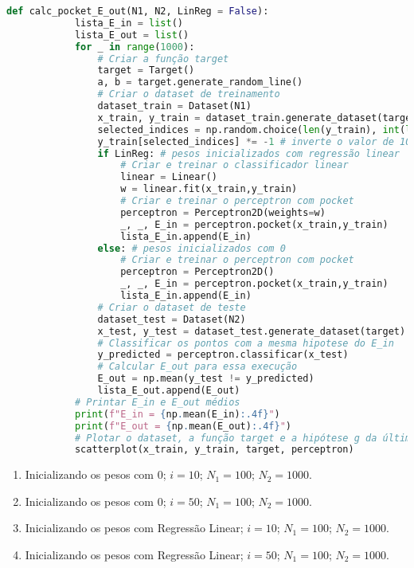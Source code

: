 \begin{enumerate}
    \begin{lstlisting}[language=Python, caption=Cálculo do E\_out, label=cod:calc_pocket_E_out]
        def calc_pocket_E_out(N1, N2, LinReg = False):
            lista_E_in = list()
            lista_E_out = list()
            for _ in range(1000):
                # Criar a função target
                target = Target()
                a, b = target.generate_random_line()
                # Criar o dataset de treinamento
                dataset_train = Dataset(N1)
                x_train, y_train = dataset_train.generate_dataset(target)
                selected_indices = np.random.choice(len(y_train), int(len(y_train) * 0.1), replace=False) # seleciona 10%
                y_train[selected_indices] *= -1 # inverte o valor de 10%
                if LinReg: # pesos inicializados com regressão linear
                    # Criar e treinar o classificador linear
                    linear = Linear()
                    w = linear.fit(x_train,y_train)
                    # Criar e treinar o perceptron com pocket
                    perceptron = Perceptron2D(weights=w)
                    _, _, E_in = perceptron.pocket(x_train,y_train)
                    lista_E_in.append(E_in)
                else: # pesos inicializados com 0
                    # Criar e treinar o perceptron com pocket
                    perceptron = Perceptron2D()
                    _, _, E_in = perceptron.pocket(x_train,y_train)
                    lista_E_in.append(E_in)
                # Criar o dataset de teste
                dataset_test = Dataset(N2)
                x_test, y_test = dataset_test.generate_dataset(target)
                # Classificar os pontos com a mesma hipotese do E_in
                y_predicted = perceptron.classificar(x_test)
                # Calcular E_out para essa execução
                E_out = np.mean(y_test != y_predicted)
                lista_E_out.append(E_out)
            # Printar E_in e E_out médios
            print(f"E_in = {np.mean(E_in):.4f}")
            print(f"E_out = {np.mean(E_out):.4f}")
            # Plotar o dataset, a função target e a hipótese g da última execução
            scatterplot(x_train, y_train, target, perceptron)
    \end{lstlisting}

    
    \begin{enumerate}
        \item Inicializando os pesos com 0; $i = 10$; $N_1 = 100$; $N_2 = 1000$.
        \item Inicializando os pesos com 0; $i = 50$; $N_1 = 100$; $N_2 = 1000$.
        \item Inicializando os pesos com Regressão Linear; $i = 10$; $N_1 = 100$; $N_2 = 1000$.
        \item Inicializando os pesos com Regressão Linear; $i = 50$; $N_1 = 100$; $N_2 = 1000$.
    \end{enumerate}

    
\end{enumerate}